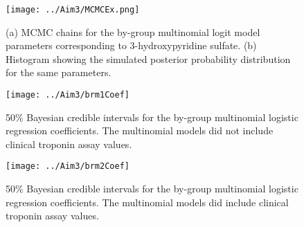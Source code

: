 \newpage
{}
\recalctypearea
\begin{figure}[H]
	\texttt{[image: ../Aim3/MCMCEx.png]}
	\caption[MCMC chain for 3-hydroxypyridine sulfate multinomial logistic regression coefficient]{(a) MCMC chains for the by-group multinomial logit model parameters corresponding to 3-hydroxypyridine sulfate. (b) Histogram showing the simulated posterior probability distribution for the same parameters. \label{fig:brm1Coef} }
\end{figure}
\newpage
\begin{figure}[H]
	\texttt{[image: ../Aim3/brm1Coef]}
	\caption[Bayesian credible intervals for multinomial logit model parameters without troponin]{50\% Bayesian credible intervals for the by-group multinomial logistic regression coefficients. The multinomial models did not include clinical troponin assay values. \label{fig:brm1Coef} }
\end{figure}
\newpage
\begin{figure}[H]
	\texttt{[image: ../Aim3/brm2Coef]}
	\caption[Bayesian credible intervals for multinomial logit model parameters with troponin]{50\% Bayesian credible intervals for the by-group multinomial logistic regression coefficients. The multinomial models did include clinical troponin assay values. \label{fig:brm2Coef} }
\end{figure}
\newpage
{}
\recalctypearea

